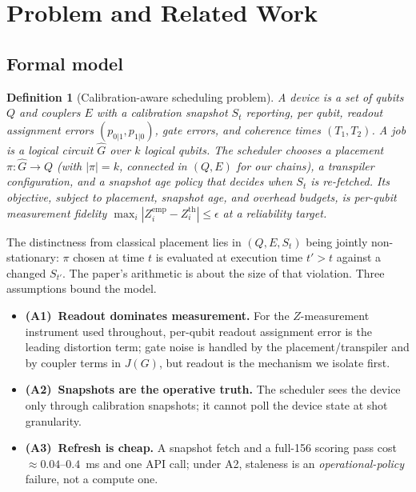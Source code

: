 \documentclass[journal,10pt,twocolumn]{IEEEtran}
\newtheorem{definition}{Definition}
\begin{document}
\section{Problem and Related Work}
\label{sec:related}
\subsection{Formal model}
\begin{definition}[Calibration-aware scheduling problem]
A device is a set of qubits $Q$ and couplers $E$ with a calibration snapshot $S_t$ reporting, per qubit, readout
assignment errors $(p_{0|1},p_{1|0})$, gate errors, and coherence times $(T_1,T_2)$. A job is a logical circuit
$\hat{G}$ over $k$ logical qubits. The scheduler chooses a \emph{placement} $\pi:\hat{G}\to Q$ (with
$|\pi|=k$, connected in $(Q,E)$ for our chains), a transpiler configuration, and a \emph{snapshot age policy}
that decides when $S_t$ is re-fetched. Its objective, subject to placement, snapshot age, and overhead budgets, is
per-qubit measurement fidelity $\max_i|Z_i^{\mathrm{emp}}\!\!-\!Z_i^{\mathrm{th}}|\!\le\!\epsilon$ at a
reliability target.
\end{definition}
The distinctness from classical placement lies in $(Q,E,S_t)$ being jointly non-stationary: $\pi$ chosen at time $t$
is evaluated at execution time $t'>t$ against a changed $S_{t'}$. The paper's arithmetic is about the size of that
violation. Three assumptions bound the model.

\begin{itemize}[leftmargin=1.1em,itemsep=1pt,topsep=2pt]
\item \textbf{(A1)~Readout dominates measurement.} For the $Z$-measurement instrument used throughout, per-qubit
readout assignment error is the leading distortion term; gate noise is handled by the placement/transpiler and by
coupler terms in $J(G)$, but readout is the mechanism we isolate first.
\item \textbf{(A2)~Snapshots are the operative truth.} The scheduler sees the device only through calibration
snapshots; it cannot poll the device state at shot granularity.
\item \textbf{(A3)~Refresh is cheap.} A snapshot fetch and a full-156 scoring pass cost $\approx0.04$--$0.4$~ms and
one API call; under A2, staleness is an \emph{operational-policy} failure, not a compute one.
\end{itemize}
\end{document}

